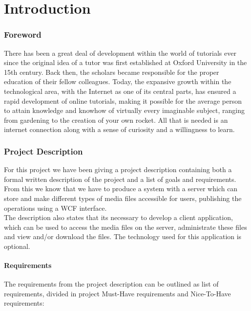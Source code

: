\part{Introduction}
\section{Foreword}
There has been a great deal of development within the world of tutorials ever since the original idea of a tutor was first established at Oxford University in the 15th century. Back then, the scholars became responsible for the proper education of their fellow colleagues. Today, the expansive growth within the technological area, with the Internet as one of its central parts, has ensured a rapid development of online tutorials, making it possible for the average person to attain knowledge and knowhow of virtually every imaginable subject, ranging from gardening to the creation of your own rocket.
All that is needed is an internet connection along with a sense of curiosity and a willingness to learn.\\


\section{Project Description}
For this project we have been giving a project description containing both a formal written description of the project and a list of goals and requirements. From this we know that we have to produce a system with a server which can store and make different types of media files accessible for users, publishing the operations using a WCF interface.\\
The description also states that its necessary to develop a client application, which can be used to access the media files on the server, administrate these files and view and/or download the files. The technology used for this application is optional.\\

\subsection{Requirements}
The requirements from the project description can be outlined as list of requirements, divided in project Must-Have requirements and Nice-To-Have requirements:

